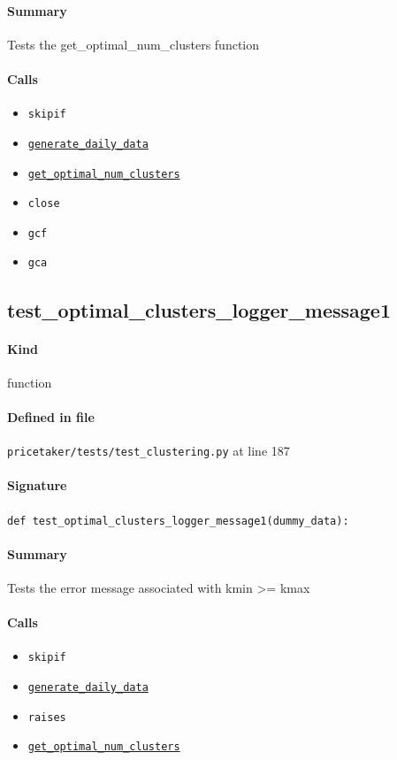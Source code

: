 \documentclass[11pt]{report}
\begin{document}
\paragraph{Summary} Tests the get\_optimal\_num\_clusters function
\paragraph{Calls}
\begin{itemize}[leftmargin=*]
  \item \texttt{skipif}
  \item \hyperref[def:pricetaker-clustering.py:generate_daily_data:L35]{\texttt{generate\_daily\_data}}
  \item \hyperref[def:pricetaker-clustering.py:get_optimal_num_clusters:L142]{\texttt{get\_optimal\_num\_clusters}}
  \item \texttt{close}
  \item \texttt{gcf}
  \item \texttt{gca}
\end{itemize}
\subsection{test\_optimal\_clusters\_logger\_message1}
\label{def:pricetaker-tests-test_clustering.py:test_optimal_clusters_logger_message1:L187}
\paragraph{Kind} function
\paragraph{Defined in file} \texttt{pricetaker/tests/test\_clustering.py} at line 187
\paragraph{Signature} \texttt{def test\_optimal\_clusters\_logger\_message1(dummy\_data):}
\paragraph{Summary} Tests the error message associated with kmin >= kmax
\paragraph{Calls}
\begin{itemize}[leftmargin=*]
  \item \texttt{skipif}
  \item \hyperref[def:pricetaker-clustering.py:generate_daily_data:L35]{\texttt{generate\_daily\_data}}
  \item \texttt{raises}
  \item \hyperref[def:pricetaker-clustering.py:get_optimal_num_clusters:L142]{\texttt{get\_optimal\_num\_clusters}}
\end{itemize}
\end{document}
